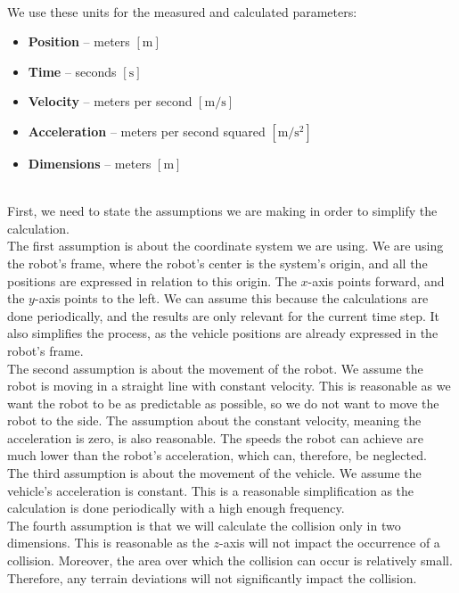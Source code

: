     \\
        We use these units for the measured and calculated parameters:
        \begin{itemize}
            \item \textbf{Position} -- meters $[\si{\m}]$
            \item \textbf{Time} -- seconds $[\si{\s}]$
            \item \textbf{Velocity} -- meters per second $[\si{\m\per\s}]$
            \item \textbf{Acceleration} -- meters per second squared $[\si{\m\per\square\s}]$
            \item \textbf{Dimensions} -- meters $[\si{\m}]$
        \end{itemize}
    \\
        First, we need to state the assumptions we are making in order to simplify the calculation.\\
        The first assumption is about the coordinate system we are using. We are using the robot's frame, where the robot's center is the system's origin, and all the positions are expressed in relation to this origin. The $x$-axis points forward, and the $y$-axis points to the left. We can assume this because the calculations are done periodically, and the results are only relevant for the current time step. It also simplifies the process, as the vehicle positions are already expressed in the robot's frame.\\
        The second assumption is about the movement of the robot. We assume the robot is moving in a straight line with constant velocity. This is reasonable as we want the robot to be as predictable as possible, so we do not want to move the robot to the side. The assumption about the constant velocity, meaning the acceleration is zero, is also reasonable. The speeds the robot can achieve are much lower than the robot's acceleration, which can, therefore, be neglected.\\
        The third assumption is about the movement of the vehicle. We assume the vehicle's acceleration is constant. This is a reasonable simplification as the calculation is done periodically with a high enough frequency.\\
        The fourth assumption is that we will calculate the collision only in two dimensions. This is reasonable as the $z$-axis will not impact the occurrence of a collision. Moreover, the area over which the collision can occur is relatively small. Therefore, any terrain deviations will not significantly impact the collision.\\\\
